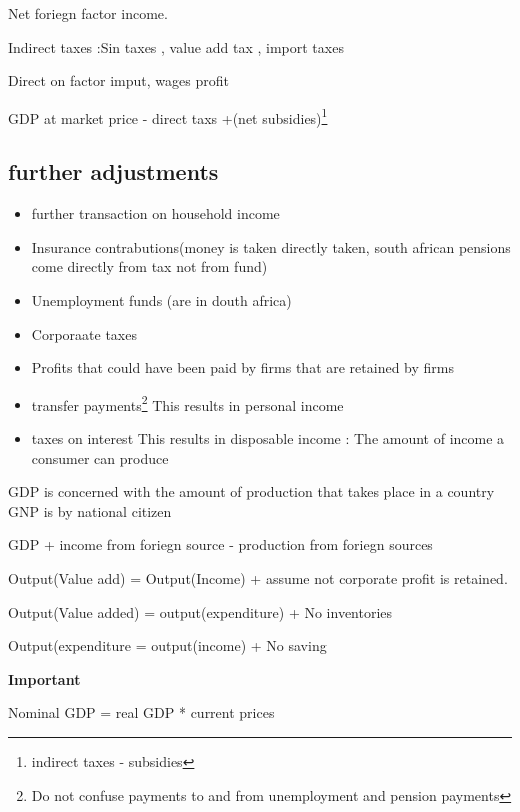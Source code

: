 \documentclass[twocolumn]{article}
\providecommand{\tightlist}{%
  \setlength{\itemsep}{0pt}\setlength{\parskip}{0pt}}
\begin{document}
Net foriegn factor income.

Indirect taxes :Sin taxes , value add tax , import taxes

\begin{description}
\tightlist
\item[Directs taxes]
Direct on factor imput, wages profit
\end{description}

GDP at market price - direct taxs +(net subsidies)\footnote{indirect
  taxes - subsidies}

\hypertarget{further-adjustments}{%
\subsection{further adjustments}\label{further-adjustments}}

\begin{itemize}
\tightlist
\item
  further transaction on household income
\item
  Insurance contrabutions(money is taken directly taken, south african
  pensions come directly from tax not from fund)
\item
  Unemployment funds (are in douth africa)
\item
  Corporaate taxes
\item
  Profits that could have been paid by firms that are retained by firms
\item
  transfer payments\footnote{Do not confuse payments to and from
    unemployment and pension payments} This results in personal income
\item
  taxes on interest This results in disposable income : The amount of
  income a consumer can produce
\end{itemize}

GDP is concerned with the amount of production that takes place in a
country GNP is by national citizen

GDP + income from foriegn source - production from foriegn sources

Output(Value add) = Output(Income) + assume not corporate profit is
retained.

Output(Value added) = output(expenditure) + No inventories

Output(expenditure = output(income) + No saving

\textbf{Important}

\begin{description}
\tightlist
\item[Nominal vs real GDP]
Nominal GDP = real GDP * current prices
\end{description}
\end{document}
